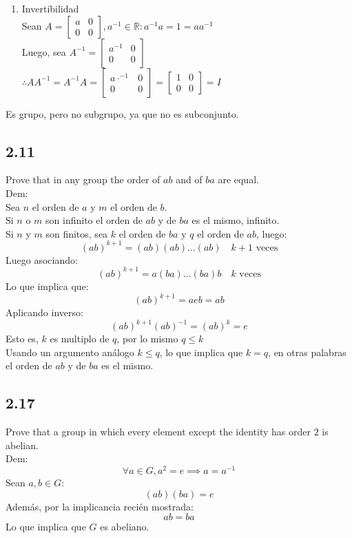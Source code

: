 \documentclass[11pt]{article}
\begin{document}
\begin{enumerate}[label=(\alph*)]
\begin{enumerate}[label=\arabic*.]
		\item Invertibilidad\\
		Sean $A=\begin{bmatrix} a & 0 \\ 0 & 0 \end{bmatrix}, a^{-1}\in\mathbb{R}:a^{-1}a=1=aa^{-1}$\\
		Luego, sea $A^{-1}=\begin{bmatrix} a^{-1} & 0 \\ 0 & 0 \end{bmatrix}$\\
		$\therefore AA^{-1}=A^{-1}A=\begin{bmatrix} a\cdot ^{-1} & 0 \\ 0 & 0 \end{bmatrix}=\begin{bmatrix} 1 & 0 \\ 0 & 0 \end{bmatrix}=I$
		
	\end{enumerate}
	Es grupo, pero no subgrupo, ya que no es subconjunto.
\end{enumerate}

\subsection*{2.11}
Prove that in any group the order of $ab$ and of $ba$ are equal.\\
Dem:\\
Sea $n$ el orden de $a$ y $m$ el orden de $b$.\\
Si $n$ o $m$ son infinito el orden de $ab$ y de $ba$ es el mismo, infinito.\\
Si $n$ y $m$ son finitos, sea $k$ el orden de $ba$ y $q$ el orden de $ab$, luego:
\[
(ab)^{k+1}=(ab)(ab)...(ab) \quad k+1\textrm{ veces}
\]
Luego asociando:
\[
(ab)^{k+1}=a(ba)...(ba)b \quad k \textrm{ veces}
\]
Lo que implica que:
\[
(ab)^{k+1}=aeb=ab
\]
Aplicando inverso:
\[
(ab)^{k+1}(ab)^{-1}=(ab)^k=e
\]
Esto es, $k$ es multiplo de $q$, por lo mismo $q\leq k$\\
Usando un argumento análogo $k\leq q$, lo que implica que $k=q$, en otras palabras el orden de $ab$ y de $ba$ es el mismo.

\subsection*{2.17}
Prove that a group in which every element except the identity has order $2$ is abelian.\\
Dem:
\[
\forall a\in G, a^2=e\implies a=a^{-1}
\]
Sean $a,b\in G$:
\[
(ab)(ba)=e
\]
Además, por la implicancia recién mostrada:
\[
ab=ba
\]
Lo que implica que $G$ es abeliano.
\end{document}
